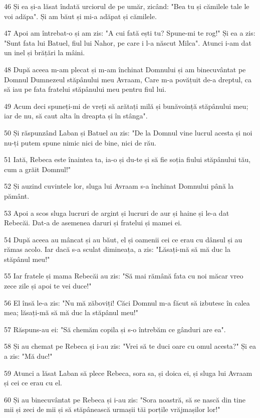 \par 46 Și ea și-a lăsat îndată urciorul de pe umăr, zicând: "Bea tu și cămilele tale le voi adăpa". Și am băut și mi-a adăpat și cămilele.
\par 47 Apoi am întrebat-o și am zis: "A cui fată ești tu? Spune-mi te rog!" Și ea a zis: "Sunt fata lui Batuel, fiul lui Nahor, pe care i l-a născut Milca". Atunci i-am dat un inel și brățări la mâini.
\par 48 După aceea m-am plecat și m-am închinat Domnului și am binecuvântat pe Domnul Dumnezeul stăpânului meu Avraam, Care m-a povățuit de-a dreptul, ca să iau pe fata fratelui stăpânului meu pentru fiul lui.
\par 49 Acum deci spuneți-mi de vreți să arătați milă și bunăvoință stăpânului meu; iar de nu, să caut alta în dreapta și în stânga".
\par 50 Și răspunzând Laban și Batuel au zis: "De la Domnul vine lucrul acesta și noi nu-ți putem spune nimic nici de bine, nici de rău.
\par 51 Iată, Rebeca este înaintea ta, ia-o și du-te și să fie soția fiului stăpânului tău, cum a grăit Domnul!"
\par 52 Și auzind cuvintele lor, sluga lui Avraam s-a închinat Domnului până la pământ.
\par 53 Apoi a scos sluga lucruri de argint și lucruri de aur și haine și le-a dat Rebecăi. Dat-a de asemenea daruri și fratelui și mamei ei.
\par 54 După aceea au mâncat și au băut, el și oamenii cei ce erau cu dânsul și au rămas acolo. Iar dacă s-a sculat dimineața, a zis: "Lăsați-mă să mă duc la stăpânul meu!"
\par 55 Iar fratele și mama Rebecăi au zis: "Să mai rămână fata cu noi măcar vreo zece zile și apoi te vei duce!"
\par 56 El însă le-a zis: "Nu mă zăboviți! Căci Domnul m-a făcut să izbutesc în calea mea; lăsați-mă să mă duc la stăpânul meu!"
\par 57 Răspuns-au ei: "Să chemăm copila și s-o întrebăm ce gânduri are ea".
\par 58 Și au chemat pe Rebeca și i-au zis: "Vrei să te duci oare cu omul acesta?" Și ea a zis: "Mă duc!"
\par 59 Atunci a lăsat Laban să plece Rebeca, sora sa, și doica ei, și sluga lui Avraam și cei ce erau cu el.
\par 60 Și au binecuvântat pe Rebeca și i-au zis: "Sora noastră, să se nască din tine mii și zeci de mii și să stăpânească urmașii tăi porțile vrăjmașilor lor!"
